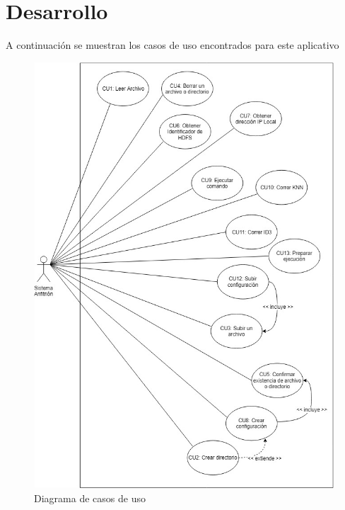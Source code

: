 \section{Desarrollo}
A continuación se muestran los casos de uso encontrados para este aplicativo 
\begin{figure}[H]
	\hypertarget{fig:confi}{\hspace{1pt}}
	\begin{center}	
		\includegraphics[width=.8\textwidth]{capitulo4a/images/diagramacu.jpeg}
		\caption{Diagrama de casos de uso}
		\label{fig:confi}
	\end{center}
\end{figure}
